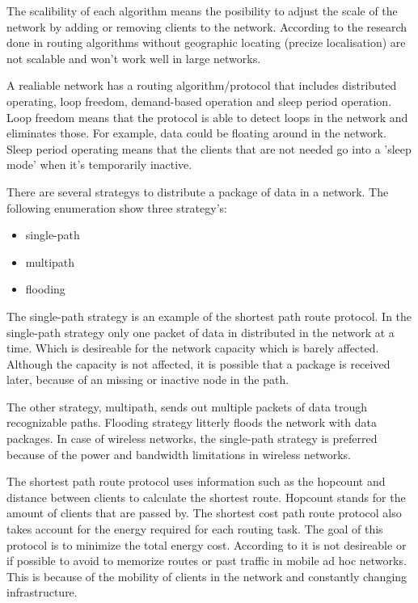 \documentclass[10pt,a4paper]{article}
\begin{document}
The scalibility of each algorithm means the posibility to adjust the scale of the network by adding or removing clients to the network. According to the research done in \cite{geographicalrouting}\cite{scalablelocation} routing algorithms without geographic locating (precize localisation) are not scalable and won't work well in large networks. 

A realiable network has a routing algorithm/protocol that includes distributed operating, loop freedom, demand-based operation and sleep period operation. Loop freedom means that the protocol is able to detect loops in the network and eliminates those. For example, data could be floating around in the network. Sleep period operating means that the clients that are not needed go into a 'sleep mode' when it's temporarily inactive.\cite{position-based}

There are several strategys to distribute a package of data in a network. The following enumeration show three strategy's:
\begin{itemize}
\setlength\itemsep{0em}
    \item single-path
    \item multipath
    \item flooding
\end{itemize}

The single-path strategy is an example of the shortest path route protocol. In the single-path strategy only one packet of data in distributed in the network at a time. Which is desireable for the network capacity which is barely affected. Although the capacity is not affected, it is possible that a package is received later, because of an missing or inactive node in the path. \cite{position-based}

The other strategy, multipath, sends out multiple packets of data trough recognizable paths. Flooding strategy litterly floods the network with data packages. In case of wireless networks, the single-path strategy is preferred because of the power and bandwidth limitations in wireless networks. \cite{position-based}

The shortest path route protocol uses information such as the hopcount and distance between clients to calculate the shortest route. Hopcount stands for the amount of clients that are passed by. The shortest cost path route protocol also takes account for the energy required for each routing task. The goal of this protocol is to minimize the total energy cost. According to \cite{position-based} it is not desireable or if possible to avoid to memorize routes or past traffic in mobile ad hoc networks. This is because of the mobility of clients in the network and constantly changing infrastructure.
\end{document}
